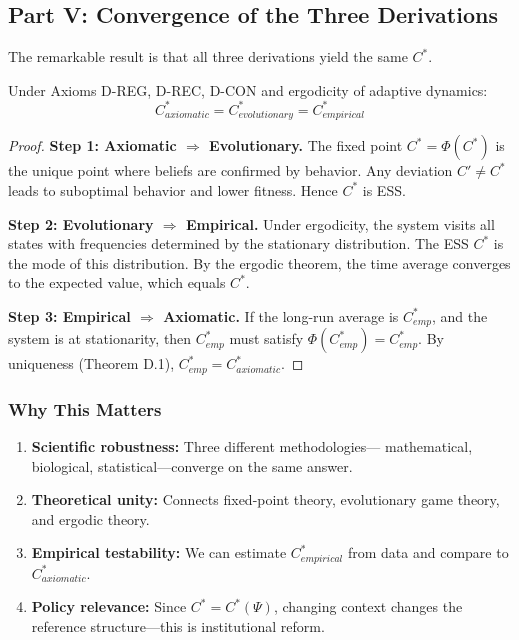 \subsection{Part V: Convergence of the Three Derivations}
\label{sec:D-convergence}

The remarkable result is that all three derivations yield the same $C^*$.

\begin{theorem}
\label{thm:D-equivalence}
Under Axioms D-REG, D-REC, D-CON and ergodicity of adaptive dynamics:
\begin{equation}
\boxed{C^*_{axiomatic} = C^*_{evolutionary} = C^*_{empirical}}
\end{equation}
\end{theorem}

\begin{proof}
\textbf{Step 1: Axiomatic $\Rightarrow$ Evolutionary.}
The fixed point $C^* = \Phi(C^*)$ is the unique point where beliefs
are confirmed by behavior. Any deviation $C' \neq C^*$ leads to
suboptimal behavior and lower fitness. Hence $C^*$ is ESS.

\textbf{Step 2: Evolutionary $\Rightarrow$ Empirical.}
Under ergodicity, the system visits all states with frequencies
determined by the stationary distribution. The ESS $C^*$ is the
mode of this distribution. By the ergodic theorem, the time average
converges to the expected value, which equals $C^*$.

\textbf{Step 3: Empirical $\Rightarrow$ Axiomatic.}
If the long-run average is $C^*_{emp}$, and the system is at stationarity,
then $C^*_{emp}$ must satisfy $\Phi(C^*_{emp}) = C^*_{emp}$. By uniqueness
(Theorem D.1), $C^*_{emp} = C^*_{axiomatic}$.
\end{proof}

\subsubsection{Why This Matters}

\begin{enumerate}
    \item \textbf{Scientific robustness:} Three different methodologies---
          mathematical, biological, statistical---converge on the same answer.
    \item \textbf{Theoretical unity:} Connects fixed-point theory,
          evolutionary game theory, and ergodic theory.
    \item \textbf{Empirical testability:} We can estimate $C^*_{empirical}$
          from data and compare to $C^*_{axiomatic}$.
    \item \textbf{Policy relevance:} Since $C^* = C^*(\Psi)$, changing
          context changes the reference structure---this is institutional reform.
\end{enumerate}


